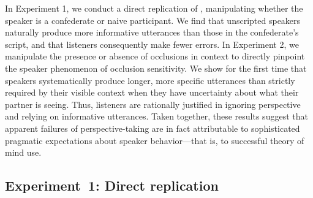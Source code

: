 \documentclass[manuscript]{stjour}
\begin{document}

In Experiment 1, we conduct a direct replication of \cite{KeysarLinBarr03_LimitsOnTheoryOfMindUse}, manipulating whether the speaker is a confederate or naive participant. We find that unscripted speakers naturally produce more informative utterances than those in the confederate's script, and that listeners consequently make fewer errors. In Experiment 2, we manipulate the presence or absence of occlusions in context to directly pinpoint the speaker phenomenon of occlusion sensitivity. We show for the first time that speakers systematically produce longer, more specific utterances than strictly required by their visible context when they have uncertainty about what their partner is seeing. Thus, listeners are rationally justified in ignoring perspective and relying on informative utterances.
Taken together, these results suggest that apparent failures of perspective-taking are in fact attributable to sophisticated pragmatic expectations about speaker behavior---that is, to successful theory of mind use.

\subsection{Experiment~1: Direct replication}
\label{sec:Exp1}
\end{document}
